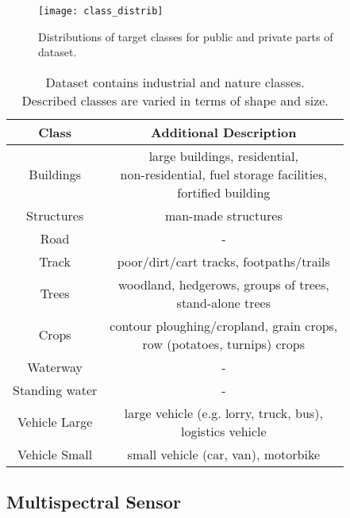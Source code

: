 \documentclass[10pt,twocolumn,letterpaper]{article}
\begin{document}
\begin{figure}[!h]
	\captionsetup{justification=centering}
	\centering
	\texttt{[image: class\_distrib]}
	\caption{ Distributions of target classes for public and private parts of dataset.}
	\label{fig:cls_distr}
\end{figure}

\begin{table}[h!]
	\begin{center}
		\captionsetup{justification=centering}
		\begin{tabular}{|c|c|}
			\hline
			\textbf{Class}    & \textbf{Additional Description} \\ \hline
			Buildings      &  \makecell{large buildings, residential, \\ non-residential, fuel storage facilities, \\ fortified building} \\ \hline
			Structures     &  man-made structures	  \\ \hline
			Road           &  	 -  \\ \hline
			Track          & poor/dirt/cart tracks, footpaths/trails	  \\ \hline
			Trees 	       &   \makecell{woodland, hedgerows, groups of trees, \\ stand-alone trees}	  \\ \hline
			Crops 	       &  \makecell{contour ploughing/cropland, grain crops, \\ row (potatoes, turnips) crops}   \\ \hline
			Waterway       &   -   \\ \hline
			Standing water &   -   \\ \hline
			Vehicle Large  & \makecell{large vehicle (e.g. lorry, truck, bus), \\ logistics vehicle}      \\ \hline
			Vehicle Small  &  small vehicle (car, van), motorbike \\ \hline
		\end{tabular}
		\caption{Dataset contains  industrial and nature classes. \\ Described classes are varied in terms of shape and size.}\label{tab:classes}
	\end{center}
\end{table}


\subsection{Multispectral Sensor}
\label{section:sensor}
\end{document}
